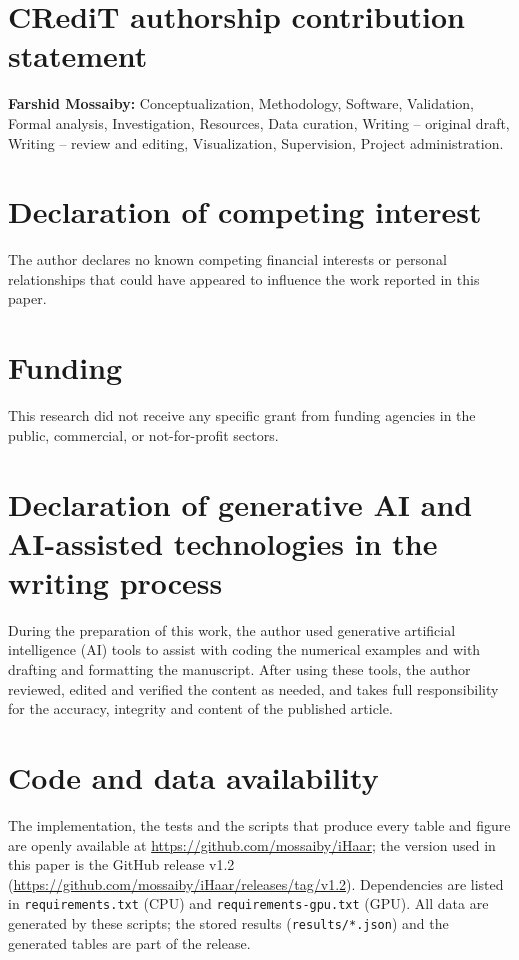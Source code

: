 \documentclass[preprint,12pt]{elsarticle}
\theoremstyle{remark}
\newcommand{\repo}{\url{https://github.com/mossaiby/iHaar}}
\newcommand{\archive}{\url{https://github.com/mossaiby/iHaar/releases/tag/v1.2}}
\begin{document}
\section*{CRediT authorship contribution statement}
\textbf{Farshid Mossaiby:} Conceptualization, Methodology, Software, Validation, Formal analysis,
Investigation, Resources, Data curation, Writing -- original draft, Writing -- review and editing,
Visualization, Supervision, Project administration.

\section*{Declaration of competing interest}
The author declares no known competing financial interests or personal relationships that could have
appeared to influence the work reported in this paper.

\section*{Funding}
This research did not receive any specific grant from funding agencies in the public, commercial, or
not-for-profit sectors.

\section*{Declaration of generative AI and AI-assisted technologies in the writing process}
During the preparation of this work, the author used generative artificial intelligence (AI) tools to
assist with coding the numerical examples and with drafting and formatting the manuscript. After using
these tools, the author reviewed, edited and verified the content as needed, and takes full
responsibility for the accuracy, integrity and content of the published article.

\section*{Code and data availability}
The implementation, the tests and the scripts that produce every table and figure are openly available
at \repo; the version used in this paper is the GitHub release v1.2 (\archive). Dependencies are listed in
\texttt{requirements.txt} (CPU) and \texttt{requirements-gpu.txt} (GPU). All data are generated by these
scripts; the stored results (\texttt{results/*.json}) and the generated tables are part of the release.

\appendix
\end{document}
